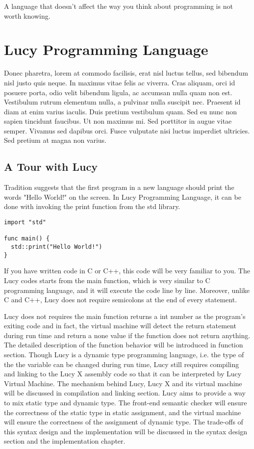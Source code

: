 \begin{savequote}[75mm]
A language that doesn't affect the way you think about programming is not worth knowing.
\end{savequote}

\chapter{Lucy Programming Language}
Donec pharetra, lorem at commodo facilisis, erat nisl luctus tellus, sed bibendum nisl justo quis neque. In maximus vitae felis ac viverra. Cras aliquam, orci id posuere porta, odio velit bibendum ligula, ac accumsan nulla quam non est. Vestibulum rutrum elementum nulla, a pulvinar nulla suscipit nec. Praesent id diam at enim varius iaculis. Duis pretium vestibulum quam. Sed eu nunc non sapien tincidunt faucibus. Ut non maximus mi. Sed porttitor in augue vitae semper. Vivamus sed dapibus orci. Fusce vulputate nisi luctus imperdiet ultricies. Sed pretium at magna non varius.


\section{A Tour with Lucy}
Tradition suggests that the first program in a new language should print the words "Hello World!" on the screen. In Lucy Programming Language, it can be done with invoking the print function from the std library.
\begin{lstlisting}
import "std"

func main() {
  std::print("Hello World!")
}
\end{lstlisting}
If you have written code in C or C++, this code will be very familiar to you. The Lucy codes starts from the main function, which is very similar to C programming language, and it will execute the code line by line. Moreover, unlike C and C++, Lucy does not require semicolons at the end of every statement.

Lucy does not requires the main function returns a int number as the program's exiting code and in fact, the virtual machine will detect the return statement during run time and return a none value if the function does not return anything. The detailed description of the function behavior will be introduced in function section. Though Lucy is a dynamic type programming language, i.e. the type of the the variable can be changed during run time, Lucy still requires compiling and linking to the Lucy X assembly code so that it can be interpreted by Lucy Virtual Machine. The mechanism behind Lucy, Lucy X and its virtual machine will be discussed in compilation and linking section. Lucy aims to provide a way to mix static type and dynamic type. The front-end semantic checker will ensure the correctness of the static type in static assignment, and the virtual machine will ensure the correctness of the assignment of dynamic type. The trade-offs of this syntax design and the implementation will be discussed in the syntax design section and the implementation chapter.

